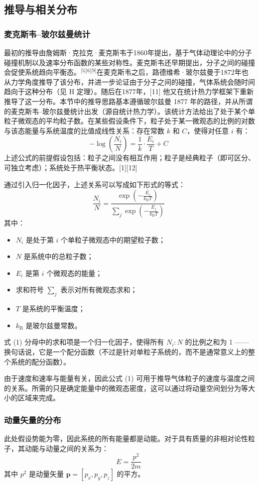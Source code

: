 \subsection{推导与相关分布}
\subsubsection{麦克斯韦–玻尔兹曼统计}
最初的推导由詹姆斯·克拉克·麦克斯韦于1860年提出，基于气体动理论中的分子碰撞机制以及速率分布函数的某些对称性。麦克斯韦还早期提出，分子之间的碰撞会促使系统趋向平衡态。\(^\text{[5][6][9]}\)在麦克斯韦之后，路德维希·玻尔兹曼于1872年也从力学角度推导了该分布，并进一步论证由于分子之间的碰撞，气体系统会随时间趋向于这种分布（见 H 定理）。随后在1877年，[11] 他又在统计热力学框架下重新推导了这一分布。本节中的推导思路基本遵循玻尔兹曼 1877 年的路径，并从所谓的麦克斯韦–玻尔兹曼统计出发（源自统计热力学）。该统计方法给出了处于某个单粒子微观态的平均粒子数。在某些假设条件下，粒子处于某一微观态的比例的对数与该态能量与系统温度的比值成线性关系：存在常数 $k$ 和 $C$，使得对任意 $i$ 有：
$$
-\log\left(\frac{N_i}{N}\right) = \frac{1}{k} \cdot \frac{E_i}{T} + C~
$$
上述公式的前提假设包括：粒子之间没有相互作用；粒子是经典粒子（即可区分、可独立考虑）；系统处于热平衡状态。[1][12]

通过引入归一化因子，上述关系可以写成如下形式的等式：
$$
\frac{N_i}{N} = \frac{\exp\left( -\frac{E_i}{k_{\text{B}} T} \right)}{\sum\limits_j \exp\left( -\frac{E_j}{k_{\text{B}} T} \right)} \tag{1}~
$$
其中：
\begin{itemize}
\item $N_i$ 是处于第 $i$ 个单粒子微观态中的期望粒子数；
\item $N$ 是系统中的总粒子数；
\item $E_i$ 是第 $i$ 个微观态的能量；
\item 求和符号 $\sum_j$ 表示对所有微观态求和；
\item $T$ 是系统的平衡温度；
\item $k_{\text{B}}$ 是玻尔兹曼常数。
\end{itemize}
式 (1) 分母中的求和项是一个归一化因子，使得所有 $N_i : N$ 的比例之和为 1 —— 换句话说，它是一个配分函数（不过是针对单粒子系统的，而不是通常意义上的整个系统的配分函数）。

由于速度和速率与能量有关，因此公式 (1) 可用于推导气体粒子的速度与温度之间的关系。所需的只是确定能量中的微观态密度，这可以通过将动量空间划分为等大小的区域来完成。
\subsubsection{动量矢量的分布}
此处假设势能为零，因此系统的所有能量都是动能。对于具有质量的非相对论性粒子，其动能与动量之间的关系为：
$$
E = \frac{p^2}{2m} \tag{2}~
$$
其中 $p^2$ 是动量矢量 $\mathbf{p} = [p_x, p_y, p_z]$ 的平方。

